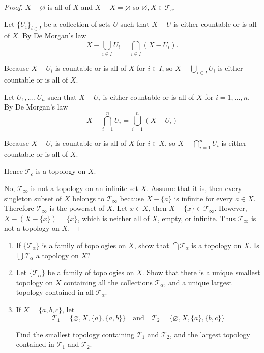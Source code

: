 \begin{proof}
    $X - \varnothing$ is all of $X$ and $X - X = \varnothing$ so $\varnothing, X\in\mathscr{T}_{c}$.

    Let ${\{ U_{i} \}}_{i\in I}$ be a collection of sets $U$ such that $X - U$ is either countable or is all of $X$. By De Morgan's law
    \[
        X - \bigcup_{i\in I}U_{i} = \bigcap_{i\in I}(X - U_{i}).
    \]

    Because $X - U_{i}$ is countable or is all of $X$ for $i\in I$, so $X - \bigcup_{i\in I}U_{i}$ is either countable or is all of $X$.

    Let $U_{1}, \ldots, U_{n}$ such that $X - U_{i}$ is either countable or is all of $X$ for $i = 1,\ldots,n$. By De Morgan's law
    \[
        X - \bigcap^{n}_{i=1}U_{i} = \bigcup^{n}_{i=1}(X - U_{i})
    \]

    Because $X - U_{i}$ is countable or is all of $X$ for $i\in X$, so $X - \bigcap^{n}_{i=1}U_{i}$ is either countable or is all of $X$.

    Hence $\mathscr{T}_{c}$ is a topology on $X$.

    \bigskip
    No, $\mathscr{T}_{\infty}$ is not a topology on an infinite set $X$. Assume that it is, then every singleton subset of $X$ belongs to $\mathscr{T}_{\infty}$ because $X - \{ a \}$ is infinite for every $a\in X$. Therefore $\mathscr{T}_{\infty}$ is the powerset of $X$. Let $x\in X$, then $X - \{ x \}\in\mathscr{T}_{\infty}$. However, $X - (X - \{ x \}) = \{ x \}$, which is neither all of $X$, empty, or infinite. Thus $\mathscr{T}_{\infty}$ is not a topology on $X$.
\end{proof}

\begin{exercise}\label{chapter2:section13:exercise4}
    \begin{enumerate}[label={(\alph*)}]
        \item If $\{ \mathscr{T}_{\alpha} \}$ is a family of topologies on $X$, show that $\bigcap \mathscr{T}_{\alpha}$ is a topology on $X$. Is $\bigcup \mathscr{T}_{\alpha}$ a topology on $X$?
        \item Let $\{ \mathscr{T}_{\alpha} \}$ be a family of topologies on $X$. Show that there is a unique smallest topology on $X$ containing all the collections $\mathscr{T}_{\alpha}$, and a unique largest topology contained in all $\mathscr{T}_{\alpha}$.
        \item If $X = \{ a, b, c \}$, let
              \[
                  \mathscr{T}_{1} = \{ \varnothing, X, \{ a \}, \{ a, b \} \}\quad\text{and}\quad\mathscr{T}_{2} = \{ \varnothing, X, \{ a \}, \{ b, c \} \}
              \]

              Find the smallest topology containing $\mathscr{T}_{1}$ and $\mathscr{T}_{2}$, and the largest topology contained in $\mathscr{T}_{1}$ and $\mathscr{T}_{2}$.
    \end{enumerate}
\end{exercise}

